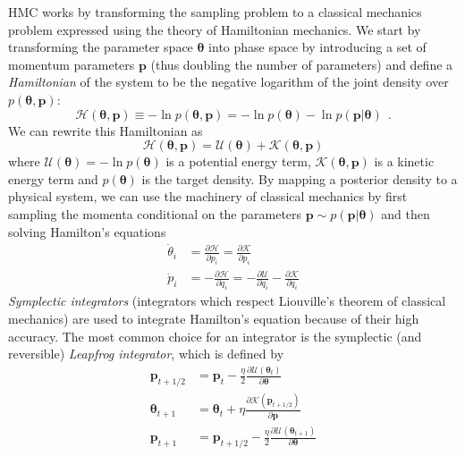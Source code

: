 \documentclass[12pt,dvipsnames]{report}
\renewcommand{\vec}[1]{\boldsymbol{\mathbf{#1}}}
\newcommand{\hquad}{~~}
\begin{document}
HMC works by transforming the sampling problem to a classical mechanics 
problem expressed using the theory of Hamiltonian mechanics. 
We start by transforming the parameter space $\boldsymbol{\theta}$ into phase space by 
introducing a set of momentum parameters $\vec{p}$ (thus doubling the number of 
parameters) and define a \textsl{Hamiltonian} of the system to be the negative logarithm 
of the  joint density over $p(\vec{\theta}, \vec{p})$:
\begin{equation}
    \mathcal{H}(\boldsymbol{\theta},\mathbf p)\equiv -\ln p(\boldsymbol{\theta},\mathbf p)=-\ln p(\boldsymbol{\theta})-\ln p(\mathbf p\lvert\boldsymbol{\theta})\hquad .
\end{equation}
We can rewrite this Hamiltonian as
\begin{equation}
    \mathcal{H}(\boldsymbol{\theta},\mathbf p)= \mathcal{U}(\boldsymbol{\theta})  + 
    \mathcal{K}(\boldsymbol{\theta},\mathbf p)
\end{equation}
where $\mathcal{U}(\boldsymbol{\theta})=-\ln p(\vec \theta)$ is a potential energy term,
 $\mathcal{K}(\boldsymbol{\theta},\vec p)$ is a kinetic energy term and 
 $p(\vec\theta)$ is the target  density.
By mapping a posterior density to a physical system, we can use the machinery of 
classical mechanics by first sampling the momenta conditional on the parameters 
$\mathbf{p}\sim p(\mathbf{p}\lvert\boldsymbol{\theta})$
 and then solving Hamilton's equations
\begin{align}
  \dot{\theta}_i&=\frac{\partial\mathcal{H}}{\partial p_i}=\frac{\partial\mathcal{K}}{\partial p_i}\\
  \dot{p}_i&=-\frac{\partial\mathcal{H}}{\partial q_i}=-\frac{\partial\mathcal{U}}{\partial q_i} - 
  \frac{\partial\mathcal{K}}{\partial q_i}
\end{align}
\textsl{Symplectic integrators} (integrators which respect Liouville's theorem of 
classical mechanics) are used to integrate Hamilton's equation because of their 
high accuracy. The most common choice for an integrator is the symplectic 
(and reversible) \textsl{Leapfrog integrator}, which is defined by 
\begin{align}
\vec{p}_{t+1 / 2} &=\vec{p}_{t}-\frac{\eta}{2} \frac{\partial \mathcal{U}\left(\boldsymbol{\theta}_{t}\right)}{\partial \boldsymbol{\theta}} \\
\boldsymbol{\theta}_{t+1} &=\boldsymbol{\theta}_{t}+\eta \frac{\partial \mathcal{K}\left(\boldsymbol{p}_{t+1 / 2}\right)}{\partial \boldsymbol{p}} \\
\vec{p}_{t+1} &=\boldsymbol{p}_{t+1 / 2}-\frac{\eta}{2} \frac{\partial \mathcal{U}\left(\boldsymbol{\theta}_{t+1}\right)}{\partial \boldsymbol{\theta}}
\end{align}
\end{document}
